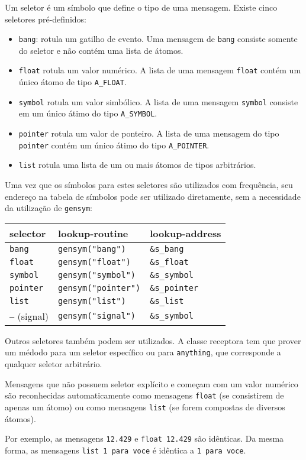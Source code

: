 Um seletor é um símbolo que define o tipo de uma mensagem. Existe cinco
seletores pré-definidos:

\begin{itemize}
  \item \texttt{bang}: rotula um gatilho de evento. Uma mensagem de
    \texttt{bang} consiste somente do seletor e não contém uma lista de átomos.
  \item \texttt{float} rotula um valor numérico. A lista de uma mensagem
    \texttt{float} contém um único átomo de tipo \texttt{A\_FLOAT}.
  \item \texttt{symbol} rotula um valor simbólico. A lista de uma mensagem
    \texttt{symbol} consiste em um único átimo do tipo \texttt{A\_SYMBOL}.
  \item \texttt{pointer} rotula um valor de ponteiro. A lista de uma mensagem do
    tipo \texttt{pointer} contém um único átimo do tipo \texttt{A\_POINTER}.
  \item \texttt{list} rotula uma lista de um ou mais átomos de tipos arbitrários.
\end{itemize}

Uma vez que os símbolos para estes seletores são utilizados com frequência,
seu endereço na tabela de símbolos pode ser utilizado diretamente, sem a
necessidade da utilização de \texttt{gensym}:

\begin{center}
\begin{tabular}{|l|l|l|}
\hline
  selector & lookup-routine & lookup-address \\
\hline
  \texttt{bang} & \texttt{gensym("bang")} & \texttt{\&s\_bang} \\
  \texttt{float} & \texttt{gensym("float")} & \texttt{\&s\_float} \\
  \texttt{symbol} & \texttt{gensym("symbol")} & \texttt{\&s\_symbol} \\
  \texttt{pointer} & \texttt{gensym("pointer")} & \texttt{\&s\_pointer} \\
  \texttt{list} & \texttt{gensym("list")} & \texttt{\&s\_list} \\
  \texttt{--}  (signal) & \texttt{gensym("signal")} & \texttt{\&s\_symbol} \\
\hline
\end{tabular}
\end{center}

Outros seletores também podem ser utilizados. A classe receptora tem que
prover um médodo para um seletor específico ou para \texttt{anything}, que
corresponde a qualquer seletor arbitrário.

Mensagens que não possuem seletor explícito e começam com um valor numérico
são reconhecidas automaticamente como mensagens \texttt{float} (se consistirem
de apenas um átomo) ou como mensagens \texttt{list} (se forem compostas de
diversos átomos).

Por exemplo, as mensagens \texttt{12.429} e \texttt{float 12.429} são
idênticas. Da mesma forma, as mensagens \texttt{list 1 para voce} é idêntica a
\texttt{1 para voce}.

